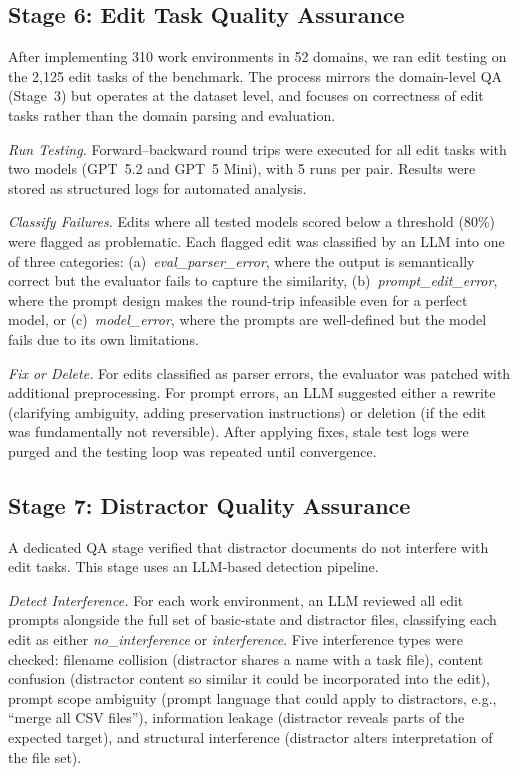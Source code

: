 \documentclass{article} %
\begin{document}
\subsection{Stage 6: Edit Task Quality Assurance} \label{app:edit_qa}
After implementing 310 work environments in 52 domains, we ran edit testing on the 2,125 edit tasks of the benchmark. The process mirrors the domain-level QA (Stage~3) but operates at the dataset level, and focuses on correctness of edit tasks rather than the domain parsing and evaluation.

\textit{Run Testing.} Forward--backward round trips were executed for all edit tasks with two models (GPT~5.2 and GPT~5 Mini), with 5 runs per pair. Results were stored as structured logs for automated analysis.

\textit{Classify Failures.} Edits where all tested models scored below a threshold (80\%) were flagged as problematic. Each flagged edit was classified by an LLM into one of three categories: (a)~\textit{eval\_parser\_error}, where the output is semantically correct but the evaluator fails to capture the similarity, (b)~\textit{prompt\_edit\_error}, where the prompt design makes the round-trip infeasible even for a perfect model, or (c)~\textit{model\_error}, where the prompts are well-defined but the model fails due to its own limitations.

\textit{Fix or Delete.} For edits classified as parser errors, the evaluator was patched with additional preprocessing. For prompt errors, an LLM suggested either a rewrite (clarifying ambiguity, adding preservation instructions) or deletion (if the edit was fundamentally not reversible). After applying fixes, stale test logs were purged and the testing loop was repeated until convergence.

\subsection{Stage 7: Distractor Quality Assurance} \label{app:distractor_qa}
A dedicated QA stage verified that distractor documents do not interfere with edit tasks. This stage uses an LLM-based detection pipeline.

\textit{Detect Interference.} For each work environment, an LLM reviewed all edit prompts alongside the full set of basic-state and distractor files, classifying each edit as either \textit{no\_interference} or \textit{interference}. Five interference types were checked: filename collision (distractor shares a name with a task file), content confusion (distractor content so similar it could be incorporated into the edit), prompt scope ambiguity (prompt language that could apply to distractors, e.g., ``merge all CSV files''), information leakage (distractor reveals parts of the expected target), and structural interference (distractor alters interpretation of the file set).
\end{document}
